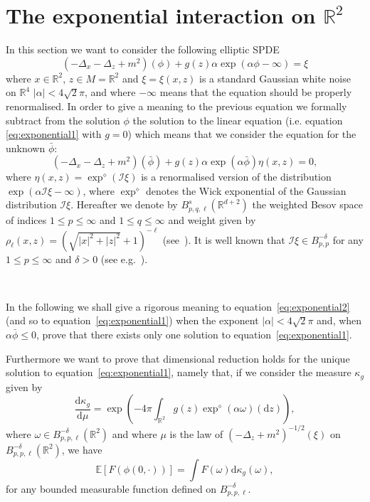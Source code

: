 \documentclass[a4paper,10pt]{article}
\newcommand{\mathd}{\mathrm{d}}
\begin{document}
\section{The exponential interaction on
$\mathbb{R}^2$}\label{section_exponential}

In this section we want to consider the following elliptic SPDE
\begin{equation}
  (- \Delta_x - \Delta_z + m^2) (\phi) + g (z) \alpha \exp (\alpha \phi -
  \infty) = \xi \label{eq:exponential1}
\end{equation}
where $x \in \mathbb{R}^2$, $z \in M =\mathbb{R}^2$ and $\xi = \xi (x, z)$ is
a standard Gaussian white noise on $\mathbb{R}^4$ $| \alpha | < 4 \sqrt{2}
\pi$, and where $- \infty$ means that the equation should be properly
renormalised. In order to give a meaning to the previous equation we formally
subtract from the solution $\phi$ the solution to the linear equation (i.e.
equation {\eqref{eq:exponential1}} with $g = 0$) which means that we consider
the equation for the unknown $\bar{\phi}$:
\begin{equation}
  (- \Delta_x - \Delta_z + m^2) (\bar{\phi}) + g (z) \alpha \exp (\alpha
  \bar{\phi}) \eta (x, z) = 0 \label{eq:exponential2},
\end{equation}
where $\eta (x, z) = \exp^{\diamond} (\mathcal{I} \xi)$ is a renormalised
version of the distribution $\exp (\alpha \mathcal{I} \xi - \infty)$, where
$\exp^{\diamond}$ denotes the Wick exponential of the Gaussian distribution
$\mathcal{I} \xi$. Hereafter we denote by $B^s_{p, q, \ell} (\mathbb{R}^{d +
2})$ the weighted Besov space of indices $1 \leqslant p \leqslant \infty$ and
$1 \leqslant q \leqslant \infty$ and weight given by $\rho_{\ell} (x, z) =
\left( \sqrt{| x |^2 + | z |^2} + 1 \right)^{- \ell}$
(see~{\cite{Triebel2006}}). It is well known that $\mathcal{I} \xi \in B^{-
\delta}_{p, p}$ for any $1 \leqslant p \leqslant \infty$ and $\delta > 0$ (see
e.g.~{\cite{GH18}}).

\

In the following we shall give a rigorous meaning to
equation~{\eqref{eq:exponential2}} (and so to
equation~{\eqref{eq:exponential1}}) when the exponent $| \alpha | < 4 \sqrt{2}
\pi$ and, when $\alpha \bar{\phi} \leqslant 0$, prove that there exists only
one solution to equation~{\eqref{eq:exponential1}}.

Furthermore we want to prove that dimensional reduction holds for the unique
solution to equation~{\eqref{eq:exponential1}}, namely that, if we consider
the measure $\kappa_g$ given by
\begin{equation}
  \frac{\mathd \kappa_g}{\mathd \mu} = \exp \left( - 4 \pi \int_{\mathbb{R}^2}
  g (z) \exp^{\diamond} (\alpha \omega) (\mathd z) \right)
  \label{eq:exponentiallaw1},
\end{equation}
where $\omega \in B^{- \delta}_{p, p, \ell} (\mathbb{R}^2)$ and where $\mu$ is
the law of $(- \Delta_z + m^2)^{- 1 / 2} (\xi)$ on $B^{- \delta}_{p, p, \ell}
(\mathbb{R}^2)$, we have
\[ \mathbb{E} [F (\phi (0, \cdot))] = \int F (\omega) \mathd \kappa_g (\omega)
   \label{eq:exponentialreduction1}, \]
for any bounded measurable function defined on $B^{- \delta}_{p, p, \ell}$.
\end{document}
